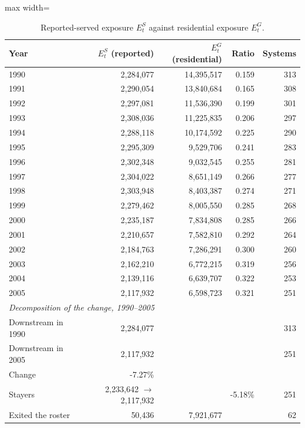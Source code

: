 \begin{table}[ht]
\centering
\caption{Reported-served exposure $E^{S}_t$ against residential exposure $E^{G}_t$.}
\label{tab:backcast_reported_exposure}
\begin{adjustbox}{max width=\textwidth}
\begin{tabular}{lrrrr}
\toprule
Year & $E^{S}_t$ (reported) & $E^{G}_t$ (residential) & Ratio & Systems \\
\midrule
1990 & 2,284,077 & 14,395,517 & 0.159 & 313 \\
1991 & 2,290,054 & 13,840,684 & 0.165 & 308 \\
1992 & 2,297,081 & 11,536,390 & 0.199 & 301 \\
1993 & 2,308,036 & 11,225,835 & 0.206 & 297 \\
1994 & 2,288,118 & 10,174,592 & 0.225 & 290 \\
1995 & 2,295,309 & 9,529,706 & 0.241 & 283 \\
1996 & 2,302,348 & 9,032,545 & 0.255 & 281 \\
1997 & 2,304,022 & 8,651,149 & 0.266 & 277 \\
1998 & 2,303,948 & 8,403,387 & 0.274 & 271 \\
1999 & 2,279,462 & 8,005,550 & 0.285 & 268 \\
2000 & 2,235,187 & 7,834,808 & 0.285 & 266 \\
2001 & 2,210,657 & 7,582,810 & 0.292 & 264 \\
2002 & 2,184,763 & 7,286,291 & 0.300 & 260 \\
2003 & 2,162,210 & 6,772,215 & 0.319 & 256 \\
2004 & 2,139,116 & 6,639,707 & 0.322 & 253 \\
2005 & 2,117,932 & 6,598,723 & 0.321 & 251 \\
\midrule
\multicolumn{5}{l}{\textit{Decomposition of the change, 1990--2005}} \\
Downstream in 1990 & 2,284,077 & & & 313 \\
Downstream in 2005 & 2,117,932 & & & 251 \\
\quad Change & -7.27\% & & & \\
\quad Stayers & 2,233,642 $\rightarrow$ 2,117,932 & & -5.18\% & 251 \\
\quad Exited the roster & 50,436 & 7,921,677 & & 62 \\
\bottomrule
\end{tabular}
\end{adjustbox}
\begin{minipage}{\textwidth}\footnotesize\raggedright

\end{minipage}
\end{table}
